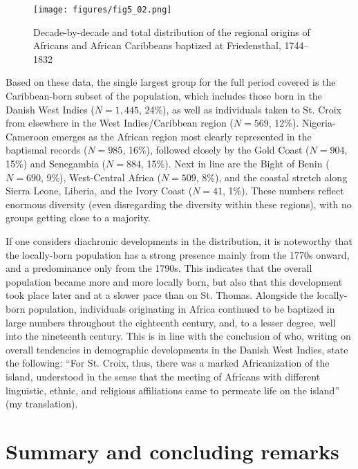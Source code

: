 \documentclass[output=paper,colorlinks,citecolor=brown]{langscibook}
\begin{document}
\begin{figure}[!ht]
    \centering
    \texttt{[image: figures/fig5\_02.png]}
    \caption{Decade-by-decade and total distribution of the regional origins of Africans and African Caribbeans baptized at Friedensthal, 1744–1832}
    \label{fig:fig5_02}
\end{figure}

Based on these data, the single largest group for the full period covered is the Caribbean-born subset of the population, which includes those born in the Danish West Indies ($N=1{,}445$, 24\%), as well as individuals taken to St. Croix from elsewhere in the West Indies/Caribbean region ($N=569$, 12\%). Nigeria-Cameroon emerges as the African region most clearly represented in the baptismal records ($N=985$, 16\%), followed closely by the Gold Coast ($N=904$, 15\%) and Senegambia ($N=884$, 15\%). Next in line are the Bight of Benin ($N=690$, 9\%), West-Central Africa ($N=509$, 8\%), and the coastal stretch along Sierra Leone, Liberia, and the Ivory Coast ($N=41$, 1\%). These numbers reflect enormous diversity (even disregarding the diversity within these regions), with no groups getting close to a majority.

If one considers diachronic developments in the distribution, it is noteworthy that the locally-born population has a strong presence mainly from the 1770s onward, and a predominance only from the 1790s. This indicates that the overall population became more and more locally born, but also that this development took place later and at a slower pace than on St. Thomas. Alongside the locally-born population, individuals originating in Africa continued to be baptized in large numbers throughout the eighteenth century, and, to a lesser degree, well into the nineteenth century. This is in line with the conclusion of \citet[151]{Simonsen_Olsen_2017} who, writing on overall tendencies in demographic developments in the Danish West Indies, state the following: “For St. Croix, thus, there was a marked Africanization of the island, understood in the sense that the meeting of Africans with different linguistic, ethnic, and religious affiliations came to permeate life on the island” (my translation).


\section{Summary and concluding remarks}
\end{document}
